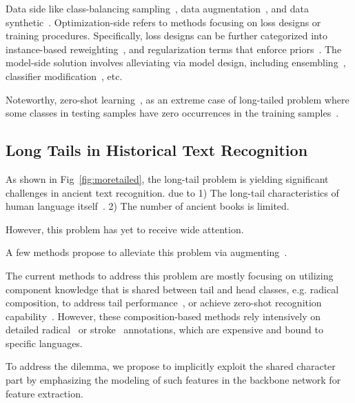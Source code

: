 Data side like class-balancing sampling~\cite{upsam}, data augmentation~\cite{cutmix}, and data synthetic~\cite{smote,hzsl}. 
Optimization-side refers to methods focusing on loss designs or training procedures. Specifically, loss designs can be further categorized into instance-based reweighting~\cite{focal,otem}, and regularization terms that enforce priors~\cite{fudanvi,sanicdar23,logvar}.
The model-side solution involves alleviating via model design, including ensembling~\cite{fle,flmoe}, classifier modification~\cite{normrob}, etc.

Noteworthy, zero-shot learning~\cite{gzsl-survey}, as an extreme case of long-tailed problem where some classes in testing samples have zero occurrences in the training samples~\cite{olt}.

\subsection{Long Tails in Historical Text Recognition}

As shown in Fig~\ref{fig:moretailed}, the long-tail problem is yielding significant challenges in ancient text recognition. 
due to 1) The long-tail characteristics of human language itself~\cite{yang2022survey}. 2) The number of ancient books is limited. 

However, this problem has yet to receive wide attention. 

A few methods propose to alleviate this problem via augmenting~\cite{aaoracle,atlt}.

The current methods to address this problem are mostly focusing on utilizing component knowledge that is shared between tail and head classes, e.g. radical composition, to address tail performance~\cite{obcmk2,sanicdar23,fudanvi}, or achieve zero-shot recognition capability~\cite{jinic21,gold,9412607,DBLP:conf/icfhr/ChandaBHHSS18,wubizhengma}. However, these composition-based methods rely intensively on detailed radical~\cite{fewran} or stroke~\cite{taktak} annotations, which are expensive and bound to specific languages.

To address the dilemma, we propose to implicitly exploit the shared character part by emphasizing the modeling of such features in the backbone network for feature extraction.
